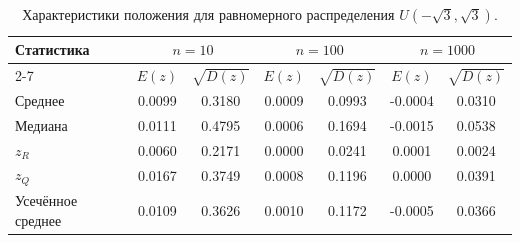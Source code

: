 \begin{table}[H]
\centering
\small
\begin{tabular}{|l|cc|cc|cc|}
\hline
\multirow{2}{*}{Статистика} & \multicolumn{2}{c|}{$n=10$} & \multicolumn{2}{c|}{$n=100$} & \multicolumn{2}{c|}{$n=1000$} \\
\cline{2-7}
 & $E(z)$ & $\sqrt{D(z)}$ & $E(z)$ & $\sqrt{D(z)}$ & $E(z)$ & $\sqrt{D(z)}$ \\
\hline
Среднее & 0.0099 & 0.3180 & 0.0009 & 0.0993 & -0.0004 & 0.0310 \\
\hline
Медиана & 0.0111 & 0.4795 & 0.0006 & 0.1694 & -0.0015 & 0.0538 \\
\hline
$z_R$ & 0.0060 & 0.2171 & 0.0000 & 0.0241 & 0.0001 & 0.0024 \\
\hline
$z_Q$ & 0.0167 & 0.3749 & 0.0008 & 0.1196 & 0.0000 & 0.0391 \\
\hline
Усечённое среднее & 0.0109 & 0.3626 & 0.0010 & 0.1172 & -0.0005 & 0.0366 \\
\hline
\end{tabular}
\caption{Характеристики положения для равномерного распределения $U(-\sqrt{3}, \sqrt{3})$.}
\label{tab:uniform_precise}
\end{table}